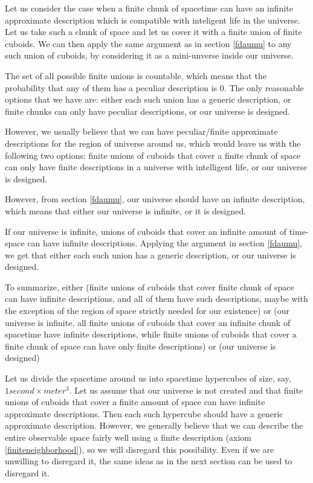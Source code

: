 \documentclass[a4paper
,draft
]{article}
\newcommand{\svn}[2][]{\todo[author=Virgil,color=red!25!white,#1]{#2}}
\begin{document}
Let us consider the case when a finite chunk of spacetime can
have an infinite approximate
description which is compatible with inteligent life in the universe.
Let us take such a chunk of space and let us cover it with a finite union of
finite cuboids.
\svn{Why would this exist? Need axiom.}
We can then apply the same argument as in section \ref{fdaumu} to any
such union of cuboids, by considering it as a mini-unverse inside
our universe.

The set of all possible finite unions is countable,
which means that the probability that any of them has a peculiar
description is $0$. The only reasonable options that we have are:
either each such union has a generic description,
or finite chunks can only have peculiar descriptions, or our universe
is designed.

However, we usually believe that we can have peculiar/finite
approximate descriptions
for the region of universe around us, which would leave us with the following
two options: finite unions of cuboids that cover a finite chunk of space can
only have finite descriptions in a universe with intelligent life, or our
universe is designed.

However, from section \ref{fdaumu}, our universe should have an
infinite description, which means that either our universe is infinite,
or it is designed.

If our universe is infinite, unions of cuboids that cover an infinite
amount of time-space can have infinite descriptions. Applying the argument
in section \ref{fdaumu}, we get that either each such union has a generic
description, or our universe is designed.

To summarize, either (finite unions of cuboids that cover finite chunk of space
can have infinite descriptions, and all of them have such descriptions, maybe
with the exception of the region of space strictly needed for our existence) or
(our universe is infinite, all finite unions of
cuboids that cover an infinite chunk of spacetime have infinite
descriptions, while finite unions of cuboids that cover a finite chunk of
space can have only finite descriptions) or (our universe is designed)

Let us divide the spacetime around us into spacetime hypercubes of size, say,
$1 second \times meter^3$. Let us assume that our universe is not created
and that finite unions of cuboids that cover a finite amount of space
can have infinite approximate descriptions. Then each such hypercube should
have a generic approximate description. However, we generally believe that
we can describe the entire observable space fairly well
using a finite description
(axiom \ref{finiteneighborhood}), so we will disregard this possibility.
Even if we are unwilling
to disregard it, the same ideas as in the next section can be used to
disregard it.
\svn{Really?}
\end{document}
